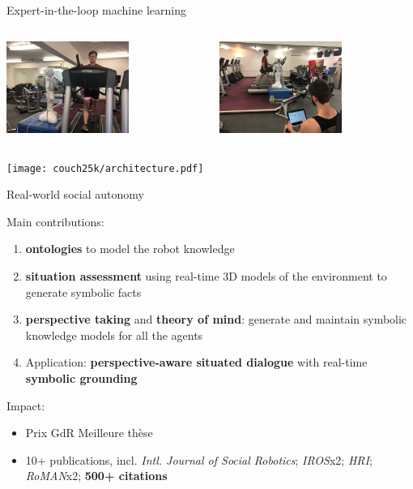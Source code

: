 \documentclass[xcolor=table]{beamer}
\begin{document}
\begin{frame}{Expert-in-the-loop machine learning}

    \begin{columns}
        \begin{column}{0.5\linewidth}
                \centering
                \includegraphics[height=3cm]{couch25k/hri.jpg}
        \end{column}
        \begin{column}{0.5\linewidth}
                \centering
                \includegraphics[height=3cm]{couch25k/supervised.jpg}
        \end{column}
    \end{columns}
        \centering
        \texttt{[image: couch25k/architecture.pdf]}
\end{frame}

\begin{frame}{Real-world social autonomy}

Main contributions:

    \begin{enumerate}
        \item \textbf{ontologies} to model the robot knowledge
        \item \textbf{situation assessment} using real-time 3D models of the
            environment to generate symbolic facts
        \item \textbf{perspective taking} and \textbf{theory of mind}: generate and
            maintain symbolic knowledge models for all the agents
        \item Application: \textbf{perspective-aware situated dialogue} with real-time \textbf{symbolic
            grounding}
    \end{enumerate}

Impact:
    \begin{itemize}
        \item Prix GdR Meilleure thèse
        \item 10+ publications, incl. \emph{Intl. Journal of Social Robotics};
            \emph{IROS}x2; \emph{HRI}; \emph{RoMAN}x2; \textbf{500+ citations}
    \end{itemize}
\end{frame}
\end{document}
